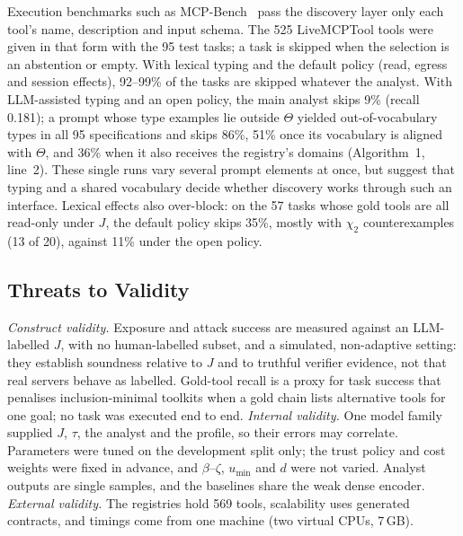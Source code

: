 Execution benchmarks such as MCP-Bench~\cite{wang2025mcpbench} pass the discovery layer only each tool's name,
description and input schema. The 525 LiveMCPTool tools were given in that form with the 95 test tasks; a task is
skipped when the selection is an abstention or empty. With lexical typing and the default policy
(read, egress and session effects), 92--99\% of the tasks are skipped whatever the analyst. With LLM-assisted
typing and an open policy, the main analyst skips 9\% (recall 0.181); a prompt whose type examples lie outside
$\Theta$ yielded out-of-vocabulary types in all 95 specifications and skips 86\%, 51\% once its vocabulary is
aligned with $\Theta$, and 36\% when it also receives the registry's domains (Algorithm~1, line~2). These single runs vary several prompt elements at once, but suggest that typing and a shared
vocabulary decide whether discovery works through such an interface. Lexical effects also over-block: on the 57 tasks whose gold tools are all read-only under $J$, the default policy skips
35\%, mostly with $\chi_2$ counterexamples (13 of 20), against 11\% under the open policy.

\subsection{Threats to Validity}
\label{sec:eval-threats}

\emph{Construct validity.} Exposure and attack success are measured against an LLM-labelled $J$, with no
human-labelled subset, and a simulated, non-adaptive setting: they establish soundness relative to $J$ and to
truthful verifier evidence, not that real servers behave as labelled. Gold-tool recall is a proxy for task
success that penalises inclusion-minimal toolkits when a gold chain lists alternative tools for one goal; no
task was executed end to end. \emph{Internal validity.} One model family supplied $J$, $\tau$, the analyst and
the profile, so their errors may correlate. Parameters were tuned on the development split only; the trust
policy and cost weights were fixed in advance, and $\beta$--$\zeta$, $u_{\min}$ and $d$ were not varied.
Analyst outputs are single samples, and the baselines share the weak dense encoder. \emph{External
validity.} The registries hold 569 tools, scalability uses generated contracts, and timings come from one
machine (two virtual CPUs, 7\,GB).
